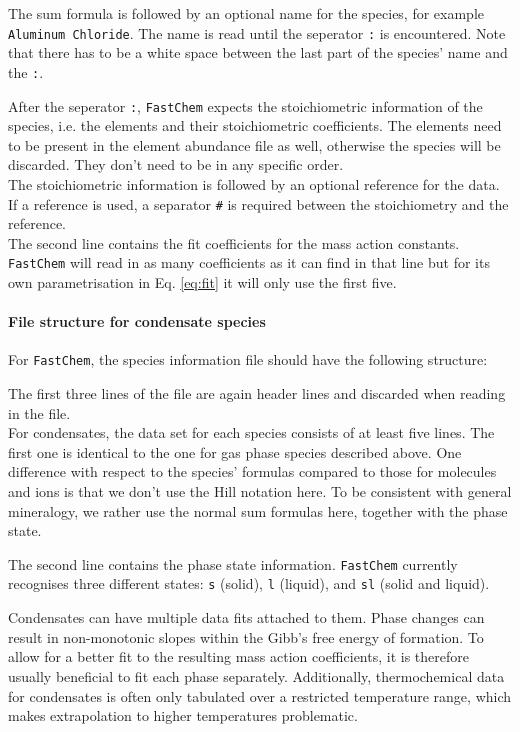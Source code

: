 \documentclass[numbers=noenddot]{aux/fcmanual}
\newcommand{\fc}{\texttt{FastChem}\xspace}
\begin{document}
The sum formula is followed by an optional name for the species, for example \verb|Aluminum Chloride|. The name is read until the seperator \verb|:| is encountered. Note that there has to be a white space between the last part of the species' name and the \verb|:|.

After the seperator \verb|:|, \fc expects the stoichiometric information of the species, i.e. the elements and their stoichiometric coefficients. The elements need to be present in the element abundance file as well, otherwise the species will be discarded. They don't need to be in any specific order.\\
The stoichiometric information is followed by an optional reference for the data. If a reference is used, a separator \verb|#| is required between the stoichiometry and the reference.\\

The second line contains the fit coefficients for the mass action constants. \fc will read in as many coefficients as it can find in that line but for its own parametrisation in Eq. \eqref{eq:fit} it will only use the first five.


\paragraph{File structure for condensate species}
For \fc, the species information file should have the following structure:

The first three lines of the file are again header lines and discarded when reading in the file. \\

For condensates, the data set for each species consists of at least five lines. The first one is identical to the one for gas phase species described above. One difference with respect to the species' formulas compared to those for molecules and ions is that we don't use the Hill notation here. To be consistent with general mineralogy, we rather use the normal sum formulas here, together with the phase state. 

The second line contains the phase state information. \fc currently recognises three different states:  \verb|s| (solid),  \verb|l| (liquid), and  \verb|sl| (solid and liquid).

Condensates can have multiple data fits attached to them. Phase changes can result in non-monotonic slopes within the Gibb's free energy of formation. To allow for a better fit to the resulting mass action coefficients, it is therefore usually beneficial to fit each phase separately. Additionally, thermochemical data for condensates is often only tabulated over a restricted temperature range, which makes extrapolation to higher temperatures problematic.  
\end{document}
